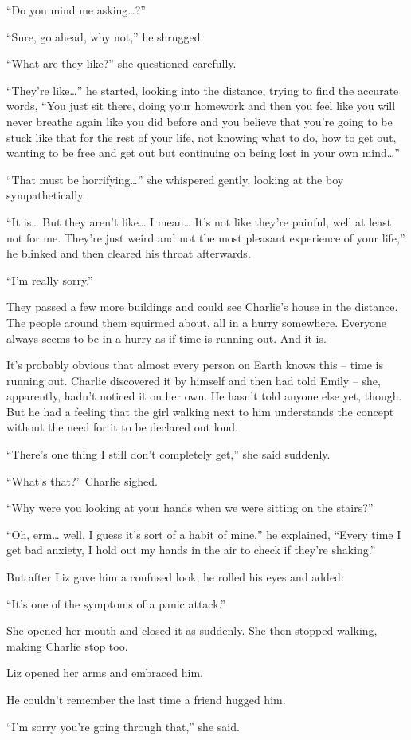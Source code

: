 “Do you mind me asking…?”

“Sure, go ahead, why not,” he shrugged.

“What are they like?” she questioned carefully.

“They're like…” he started, looking into the distance, trying to find the accurate words, “You just sit there, doing your homework and then you feel like you will never breathe again like you did before and you believe that you're going to be stuck like that for the rest of your life, not knowing what to do, how to get out, wanting to be free and get out but continuing on being lost in your own mind…”

“That must be horrifying…” she whispered gently, looking at the boy sympathetically.

“It is… But they aren't like… I mean… It's not like they're painful, well at least not for me. They're just weird and not the most pleasant experience of your life,” he blinked and then cleared his throat afterwards.

“I'm really sorry.”

They passed a few more buildings and could see Charlie's house in the distance. The people around them squirmed about, all in a hurry somewhere. Everyone always seems to be in a hurry as if time is running out. And it is.

It's probably obvious that almost every person on Earth knows this – time is running out. Charlie discovered it by himself and then had told Emily – she, apparently, hadn't noticed it on her own. He hasn't told anyone else yet, though. But he had a feeling that the girl walking next to him understands the concept without the need for it to be declared out loud.

“There's one thing I still don't completely get,” she said suddenly.

“What's that?” Charlie sighed.

“Why were you looking at your hands when we were sitting on the stairs?”

“Oh, erm… well, I guess it's sort of a habit of mine,” he explained, “Every time I get bad anxiety, I hold out my hands in the air to check if they're shaking.”

But after Liz gave him a confused look, he rolled his eyes and added:

“It's one of the symptoms of a panic attack.”

She opened her mouth and closed it as suddenly. She then stopped walking, making Charlie stop too.

Liz opened her arms and embraced him.

He couldn't remember the last time a friend hugged him.

“I'm sorry you're going through that,” she said.